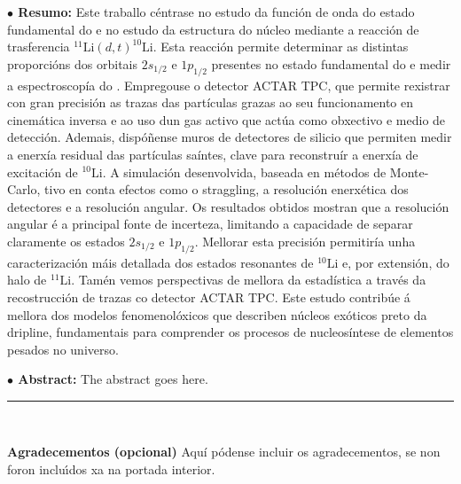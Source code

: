 \thispagestyle{empty} %
\pagebreak


\begin{flushleft}  {\bf $\bullet$ Resumo:\;\;}
%
Este traballo céntrase no estudo da función de onda do estado fundamental do \litioOnce e no estudo da estructura do núcleo \litioDiez mediante a reacción de trasferencia $^{11}\text{Li}(d,t)^{10}\text{Li}$. Esta reacción permite determinar as distintas proporcións dos orbitais $2s_{1/2}$ e $1p_{1/2}$ presentes no estado fundamental do \litioOnce e medir a espectroscopía do \litioDiez. Empregouse o detector ACTAR TPC, que permite rexistrar con gran precisión as trazas das partículas grazas ao seu funcionamento en cinemática inversa e ao uso dun gas activo que actúa como obxectivo e medio de detección. Ademais, dispóñense muros de detectores de silicio que permiten medir a enerxía residual das partículas saíntes, clave para reconstruír a enerxía de excitación de $^{10}\mathrm{Li}$. A simulación desenvolvida, baseada en métodos de Monte-Carlo, tivo en conta efectos como o straggling, a resolución enerxética dos detectores e a resolución angular. Os resultados obtidos mostran que a resolución angular é a principal fonte de incerteza, limitando a capacidade de separar claramente os estados $2s_{1/2}$ e $1p_{1/2}$. Mellorar esta precisión permitiría unha caracterización máis detallada dos estados resonantes de $^{10}\mathrm{Li}$ e, por extensión, do halo de $^{11}\mathrm{Li}$. Tamén vemos perspectivas de mellora da estadística a través da recostrucción de trazas co detector ACTAR TPC. Este estudo contribúe á mellora dos modelos fenomenolóxicos que describen núcleos exóticos preto da dripline, fundamentais para comprender os procesos de nucleosíntese de elementos pesados no universo.


%
\end{flushleft}\mbox{}


\mbox{}


\begin{flushleft}  {\bf $\bullet$ Abstract:\;\;}
%
The abstract goes here.
%
\end{flushleft}\mbox{}

\begin{center}
\rule{61mm}{0.1mm}\\
\end{center}
{\bf Agradecementos (opcional)}
Aquí pódense incluir os agradecementos, se non foron inclu\'{\i}dos xa na portada interior.

